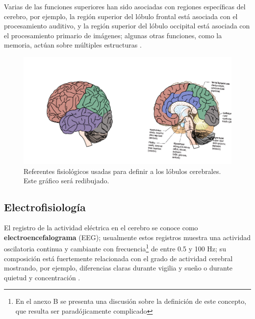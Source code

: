 Varias de las funciones superiores han sido asociadas con regiones específicas del cerebro, por
ejemplo, la región superior del lóbulo frontal está asociada con el procesamiento auditivo, y la
región superior del lóbulo occipital está asociada con el procesamiento primario de imágenes;
algunas otras funciones, como la memoria, actúan sobre múltiples estructuras \cite{Clark98}.

\begin{figure}
\centering
\includegraphics[width=\linewidth]{./img_diagramas/cerebro_zonas.pdf} 
\caption{Referentes fisiológicos usadas para definir a los lóbulos cerebrales. 
Este gráfico será redibujado.
}
\label{lobulos}
\end{figure}


\subsection{Electrofisiología}

El registro de la actividad eléctrica en el cerebro se conoce como \textbf{electroencefalograma} 
(EEG); usualmente estos registros muestra una actividad oscilatoria continua y cambiante con 
frecuencia\footnote{En el anexo B se presenta una discusión sobre la definición de este concepto, 
que resulta ser paradójicamente complicado} de entre 0.5 y 100 Hz; su composición está fuertemente 
relacionada con el grado de actividad cerebral mostrando, por ejemplo, diferencias claras durante 
vigilia y sueño o durante quietud y concentración \cite{Clark98}.

